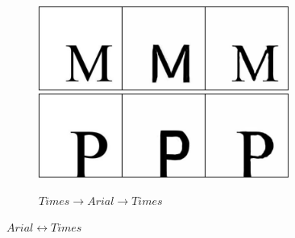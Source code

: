 \documentclass[10pt,twocolumn,letterpaper]{article}
\begin{document}
\begin{figure}[!htb]
\begin{subfigure}[]{0.49\textwidth}
         \vspace{0.3cm}
		 \includegraphics[width=0.9\textwidth]{test_b_2_a_117}\\
		 \vspace{0.3cm}
		 \includegraphics[width=0.9\textwidth]{test_b_2_a_136}\\
		 \caption{$Times \rightarrow Arial \rightarrow Times$}
         \label{fig:times2arial}
     \end{subfigure}

     \caption{$Arial \leftrightarrow Times$}
     \label{fig:arial22times}
\end{figure} 
\end{document}
